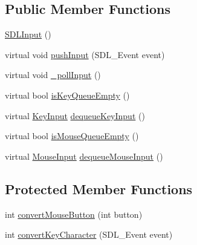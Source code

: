 \subsection*{Public Member Functions}
\begin{DoxyCompactItemize}
\item 
\hyperlink{classgcn_1_1SDLInput_ac354cdcd092ff691cab144c835aeea2e}{S\+D\+L\+Input} ()
\item 
virtual void \hyperlink{classgcn_1_1SDLInput_a8bfb0c916495042ee5b33f55c5c710a7}{push\+Input} (S\+D\+L\+\_\+\+Event event)
\item 
virtual void \hyperlink{classgcn_1_1SDLInput_a80688b038f80eeaf1ac4b2a24612fc59}{\+\_\+poll\+Input} ()
\item 
virtual bool \hyperlink{classgcn_1_1SDLInput_a0f58ca54ecee86f8d85e01f61d3bdbfd}{is\+Key\+Queue\+Empty} ()
\item 
virtual \hyperlink{classgcn_1_1KeyInput}{Key\+Input} \hyperlink{classgcn_1_1SDLInput_ab06253df88e9ddabcb69450d5ac64590}{dequeue\+Key\+Input} ()
\item 
virtual bool \hyperlink{classgcn_1_1SDLInput_ab12362c0fbbf75260e479f048e49a27c}{is\+Mouse\+Queue\+Empty} ()
\item 
virtual \hyperlink{classgcn_1_1MouseInput}{Mouse\+Input} \hyperlink{classgcn_1_1SDLInput_a396ed15921d71e5c79daeb94ac6d01e9}{dequeue\+Mouse\+Input} ()
\end{DoxyCompactItemize}
\subsection*{Protected Member Functions}
\begin{DoxyCompactItemize}
\item 
int \hyperlink{classgcn_1_1SDLInput_ab5046271e910ffbb8020b49363f3675a}{convert\+Mouse\+Button} (int button)
\item 
int \hyperlink{classgcn_1_1SDLInput_a3500dfeabf3ee545c2c1c46a25e96b00}{convert\+Key\+Character} (S\+D\+L\+\_\+\+Event event)
\end{DoxyCompactItemize}
